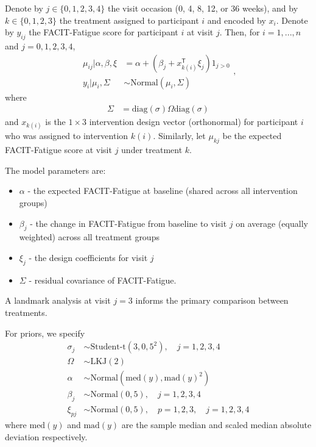 \documentclass[11pt,parskip=half-]{scrartcl}
\providecommand{\tightlist}{%
  \setlength{\itemsep}{0pt}\setlength{\parskip}{0pt}}
\begin{document}
Denote by $j\in\{0,1,2,3, 4\}$ the visit occasion (0, 4, 8, 12, or 36 weeks), and by $k\in\{0,1,2,3\}$ the treatment assigned to participant $i$ and encoded by $x_i$. Denote by $y_{ij}$ the FACIT-Fatigue score for participant $i$ at visit $j$. Then, for $i=1,...,n$ and $j=0,1,2,3,4$,
$$
  \begin{aligned}
    \mu_{ij}|\alpha,\beta,\xi & = \alpha + (\beta_j + x_{k(i)}^\mathsf{T}\xi_{j})1_{j>0} \\
    y_{i}|\mu_i, \Sigma       & \sim \text{Normal}\left(\mu_{i}, \Sigma\right)
  \end{aligned},
$$
where
$$
  \begin{aligned}
    \Sigma & = \text{diag}(\sigma)\Omega\text{diag}(\sigma)
  \end{aligned}
$$
and $x_{k(i)}$ is the $1\times 3$ intervention design vector (orthonormal) for participant $i$ who was assigned to intervention $k(i)$. Similarly, let $\mu_{kj}$ be the expected FACIT-Fatigue score at visit $j$ under treatment $k$.

The model parameters are:
\begin{itemize}
  \tightlist
  \item $\alpha$ - the expected FACIT-Fatigue at baseline (shared across all intervention groups)
  \item $\beta_j$ - the change in FACIT-Fatigue from baseline to visit $j$ on average (equally weighted) across all treatment groups
  \item $\xi_{j}$ - the design coefficients for visit $j$
  \item $\Sigma$ - residual covariance of FACIT-Fatigue.
\end{itemize}
A landmark analysis at visit $j=3$ informs the primary comparison between treatments.

For priors, we specify
$$
  \begin{aligned}
    \sigma_j & \sim \text{Student-t}(3, 0, 5^2),\quad j=1,2,3,4              \\
    \Omega   & \sim \text{LKJ}(2)                                            \\
    \alpha   & \sim \text{Normal}\left(\text{med}(y), \text{mad}(y)^2\right) \\
    \beta_j  & \sim \text{Normal}\left(0, 5\right),\quad j=1,2,3,4           \\
    \xi_{pj} & \sim \text{Normal}(0, 5),\quad p=1,2,3,\quad j=1,2,3,4
  \end{aligned}
$$
where $\text{med}(y)$ and $\text{mad}(y)$ are the sample median and scaled median absolute deviation respectively.
\end{document}
